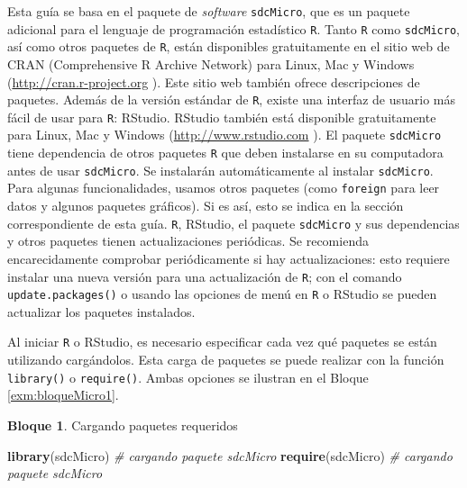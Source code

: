 \documentclass[]{book}
\newenvironment{Shaded}{\begin{snugshade}}{\end{snugshade}}
\newcommand{\CommentTok}[1]{\textcolor[rgb]{0.56,0.35,0.01}{\textit{#1}}}
\newcommand{\KeywordTok}[1]{\textcolor[rgb]{0.13,0.29,0.53}{\textbf{#1}}}
\newcommand{\NormalTok}[1]{#1}
\theoremstyle{definition}
\theoremstyle{definition}
\newtheorem{example}{Bloque}[chapter]
\theoremstyle{definition}
\theoremstyle{definition}
\theoremstyle{remark}
\begin{document}
Esta guía se basa en el paquete de \emph{software} \texttt{sdcMicro}, que es un paquete adicional para el lenguaje de programación estadístico \texttt{R}. Tanto \texttt{R} como \texttt{sdcMicro}, así como otros paquetes de \texttt{R}, están disponibles gratuitamente en el sitio web de CRAN (Comprehensive R Archive Network) para Linux, Mac y Windows (\url{http://cran.r-project.org} ). Este sitio web también ofrece descripciones de paquetes. Además de la versión estándar de \texttt{R}, existe una interfaz de usuario más fácil de usar para \texttt{R}: RStudio. RStudio también está disponible gratuitamente para Linux, Mac y Windows (\url{http://www.rstudio.com} ). El paquete \texttt{sdcMicro} tiene dependencia de otros paquetes \texttt{R} que deben instalarse en su computadora antes de usar \texttt{sdcMicro}. Se instalarán automáticamente al instalar \texttt{sdcMicro}. Para algunas funcionalidades, usamos otros paquetes (como \texttt{foreign} para leer datos y algunos paquetes gráficos). Si es así, esto se indica en la sección correspondiente de esta guía. \texttt{R}, RStudio, el paquete \texttt{sdcMicro} y sus dependencias y otros paquetes tienen actualizaciones periódicas. Se recomienda encarecidamente comprobar periódicamente si hay actualizaciones: esto requiere instalar una nueva versión para una actualización de \texttt{R}; con el comando \texttt{update.packages()} o usando las opciones de menú en \texttt{R} o RStudio se pueden actualizar los paquetes instalados.

Al iniciar \texttt{R} o RStudio, es necesario especificar cada vez qué paquetes se están utilizando cargándolos. Esta carga de paquetes se puede realizar con la función \texttt{library()} o \texttt{require()}. Ambas opciones se ilustran en el Bloque \ref{exm:bloqueMicro1}.

\begin{example}
\protect\hypertarget{exm:bloqueMicro1}{}{\label{exm:bloqueMicro1} }Cargando paquetes requeridos
\end{example}

\begin{Shaded}
\begin{Highlighting}[]
\KeywordTok{library}\NormalTok{(sdcMicro) }\CommentTok{# cargando paquete sdcMicro}
\KeywordTok{require}\NormalTok{(sdcMicro) }\CommentTok{# cargando paquete sdcMicro}
\end{Highlighting}
\end{Shaded}
\end{document}
